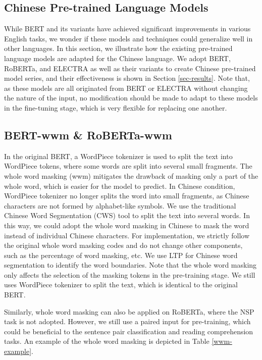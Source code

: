 \documentclass[journal]{IEEEtran}
\begin{document}
\begin{CJK*}{UTF8}{gbsn}
\section{Chinese Pre-trained Language Models}

While BERT and its variants have achieved significant improvements in various English tasks, we wonder if these models and techniques could generalize well in other languages.
In this section, we illustrate how the existing pre-trained language models are adapted for the Chinese language.
We adopt BERT, RoBERTa, and ELECTRA as well as their variants to create Chinese pre-trained model series, and their effectiveness is shown in Section \ref{sec-results}.
Note that, as these models are all originated from BERT or ELECTRA without changing the nature of the input, no modification should be made to adapt to these models in the fine-tuning stage, which is very flexible for replacing one another.



\subsection{BERT-wwm \& RoBERTa-wwm}
In the original BERT, a WordPiece tokenizer \cite{wu2016google} is used to split the text into WordPiece tokens, where some words are split into several small fragments.
The whole word masking (wwm) mitigates the drawback of masking only a part of the whole word, which is easier for the model to predict.
In Chinese condition, WordPiece tokenizer no longer splits the word into small fragments, as Chinese characters are not formed by alphabet-like symbols.
We use the traditional Chinese Word Segmentation (CWS) tool to split the text into several words.
In this way, we could adopt the whole word masking in Chinese to mask the word instead of individual Chinese characters.
For implementation, we strictly follow the original whole word masking codes and do not change other components, such as the percentage of word masking, etc.
We use LTP \cite{che2010ltp} for Chinese word segmentation to identify the word boundaries.
Note that the whole word masking only affects the selection of the masking tokens in the pre-training stage. 
We still uses WordPiece tokenizer to split the text, which is identical to the original BERT.

Similarly, whole word masking can also be applied on RoBERTa, where the NSP task is not adopted. 
However, we still use a paired input for pre-training, which could be beneficial to the sentence pair classification and reading comprehension tasks.
An example of the whole word masking is depicted in Table \ref{wwm-example}.





\end{CJK*}
\end{document}
